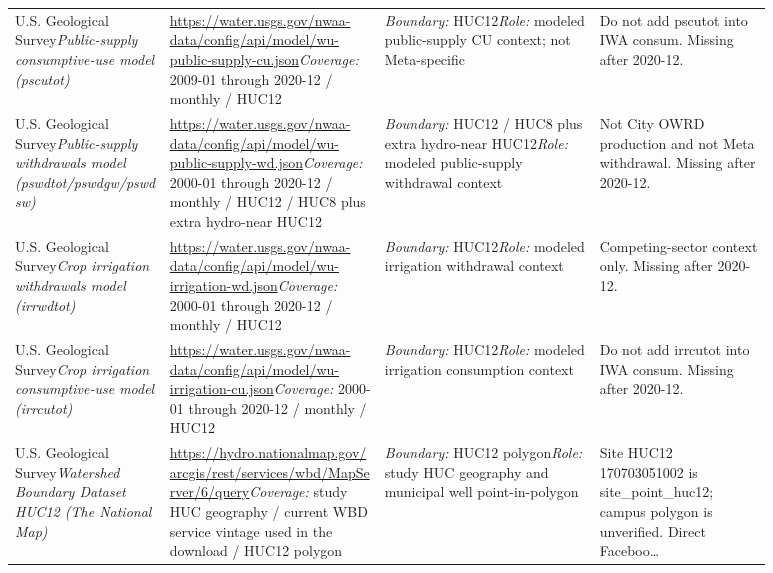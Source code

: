 \documentclass[11pt]{article}
\begin{document}
\begin{longtable}{@{}p{0.18\linewidth}p{0.25\linewidth}p{0.25\linewidth}p{0.20\linewidth}@{}}
U.S. Geological Survey\newline \textit{Public-supply consumptive-use model (pscutot)} & \url{https://water.usgs.gov/nwaa-data/config/api/model/wu-public-supply-cu.json}\newline \textit{Coverage:} 2009-01 through 2020-12 / monthly / HUC12 & \textit{Boundary:} HUC12\newline \textit{Role:} modeled public-supply CU context; not Meta-specific & Do not add pscutot into IWA consum. Missing after 2020-12.\\
U.S. Geological Survey\newline \textit{Public-supply withdrawals model (pswdtot/pswdgw/pswdsw)} & \url{https://water.usgs.gov/nwaa-data/config/api/model/wu-public-supply-wd.json}\newline \textit{Coverage:} 2000-01 through 2020-12 / monthly / HUC12 / HUC8 plus extra hydro-near HUC12 & \textit{Boundary:} HUC12 / HUC8 plus extra hydro-near HUC12\newline \textit{Role:} modeled public-supply withdrawal context & Not City OWRD production and not Meta withdrawal. Missing after 2020-12.\\
U.S. Geological Survey\newline \textit{Crop irrigation withdrawals model (irrwdtot)} & \url{https://water.usgs.gov/nwaa-data/config/api/model/wu-irrigation-wd.json}\newline \textit{Coverage:} 2000-01 through 2020-12 / monthly / HUC12 & \textit{Boundary:} HUC12\newline \textit{Role:} modeled irrigation withdrawal context & Competing-sector context only. Missing after 2020-12.\\
U.S. Geological Survey\newline \textit{Crop irrigation consumptive-use model (irrcutot)} & \url{https://water.usgs.gov/nwaa-data/config/api/model/wu-irrigation-cu.json}\newline \textit{Coverage:} 2000-01 through 2020-12 / monthly / HUC12 & \textit{Boundary:} HUC12\newline \textit{Role:} modeled irrigation consumption context & Do not add irrcutot into IWA consum. Missing after 2020-12.\\
U.S. Geological Survey\newline \textit{Watershed Boundary Dataset HUC12 (The National Map)} & \url{https://hydro.nationalmap.gov/arcgis/rest/services/wbd/MapServer/6/query}\newline \textit{Coverage:} study HUC geography / current WBD service vintage used in the download / HUC12 polygon & \textit{Boundary:} HUC12 polygon\newline \textit{Role:} study HUC geography and municipal well point-in-polygon & Site HUC12 170703051002 is site\_point\_huc12; campus polygon is unverified. Direct Faceboo\ldots\\

\end{longtable}
\end{document}
